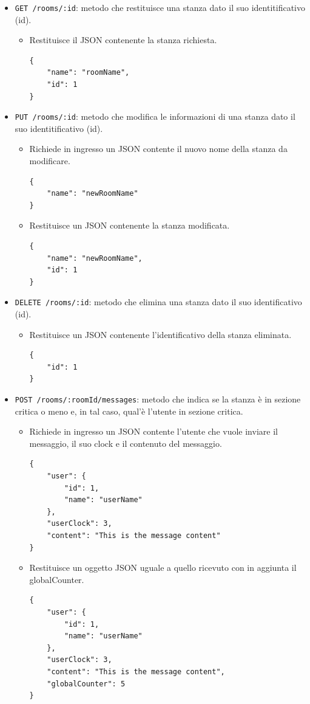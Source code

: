 \documentclass[a4paper]{article}
\begin{document}
\begin{itemize}
\begin{itemize}
\begin{verbatim}
    {
        "name": "roomName",
        "id": 2
    }
]
        \end{verbatim}
    \end{itemize}
    \item \texttt{GET /rooms/:id}: metodo che restituisce una stanza dato il suo identitificativo (id).
    \begin{itemize}
        \item Restituisce il JSON contenente la stanza richiesta.
        \begin{verbatim}
{
    "name": "roomName",
    "id": 1
}
        \end{verbatim}
    \end{itemize}
    \item \texttt{PUT /rooms/:id}: metodo che modifica le informazioni di una stanza dato il suo identitificativo (id).
    \begin{itemize}
        \item Richiede in ingresso un JSON contente il nuovo nome della stanza da modificare.
        \begin{verbatim}
{
    "name": "newRoomName"
}
        \end{verbatim}
        \item Restituisce un JSON contenente la stanza modificata.
        \begin{verbatim}
{
    "name": "newRoomName",
    "id": 1
}
        \end{verbatim}
        \end{itemize}
    \item \texttt{DELETE /rooms/:id}: metodo che elimina una stanza dato il suo identificativo (id).
    \begin{itemize}
        \item Restituisce un JSON contenente l'identificativo della stanza eliminata.
        \begin{verbatim}
{
    "id": 1
}
        \end{verbatim}
    \end{itemize}
    \item \texttt{POST /rooms/:roomId/messages}: metodo che indica se la stanza è in sezione critica o meno e, in tal caso, qual'è l'utente in sezione critica.
    \begin{itemize}
        \item Richiede in ingresso un JSON contente l'utente che vuole inviare il messaggio, il suo clock e il contenuto del messaggio.
        \begin{verbatim}
{
    "user": {
        "id": 1,
        "name": "userName"
    },
    "userClock": 3,
    "content": "This is the message content"
}
        \end{verbatim}
        \item Restituisce un oggetto JSON uguale a quello ricevuto con in aggiunta il globalCounter.
        \begin{verbatim}
{
    "user": {
        "id": 1,
        "name": "userName"
    },
    "userClock": 3,
    "content": "This is the message content",
    "globalCounter": 5
}
        \end{verbatim}
    \end{itemize}
    

\end{itemize}
\end{document}
